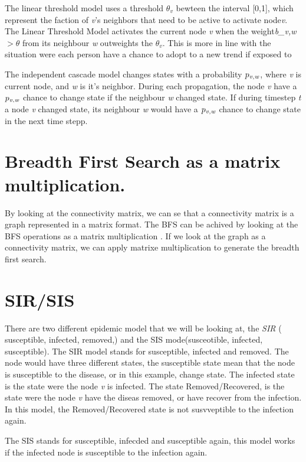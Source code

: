 The linear threshold model uses a threshold $\theta_v$ bewteen the interval [0,1], which represent the faction of {\it v}'s neighbors that need to be active to activate node{\it v}. The Linear Threshold Model activates the current node {\it v} when the weight{\it b_{v,w}} $> \theta$ from its neighbour {\it w} outweights the $\theta_v$. This is more in line with the situation were each person have a chance to adopt to a new trend if exposed to 

The independent cascade model changes states with a probability $p_{\it v, w}$, where {\it v }is current node, and {\it w} is it's neighbor. During each propagation, the node {\it v} have a  $p_{\it v, w}$ chance to change state if the neighbour {\it w} changed state. If during timestep {\it t} a node {\it v} changed state, its neighbour {\it w} would have a  $p_{\it v, w}$ chance to change state in the next time stepp. 

\section{Breadth First Search as a matrix multiplication.}
By looking at the 	connectivity matrix, we can se that a connectivity matrix is a graph represented in a matrix format. The BFS can be achived by looking at the BFS operations as a matrix multiplication \cite{algoToMath}. If we look at the graph as a connectivity matrix, we can apply matrixe multiplication to generate the breadth first search. 

\section{SIR/SIS}
There are two different epidemic model that we will be looking at, the {\it SIR} ( susceptible, infected, removed,) and the SIS mode(susceotible, infected, susceptible). The SIR model stands for susceptible, infected and removed. The node would have three different states, the susceptible state mean that the node is susceptible to the disease, or in this example, change state. The infected state is the state were the node {\it v} is infected. The state Removed/Recovered, is the state were the node {\it v} have the diseas removed, or have recover from the infection. In this model, the Removed/Recovered state is not susvveptible to the infection again. 

The SIS stands for susceptible, infecded and susceptible again, this model works if the infected node is susceptible to the infection again. \